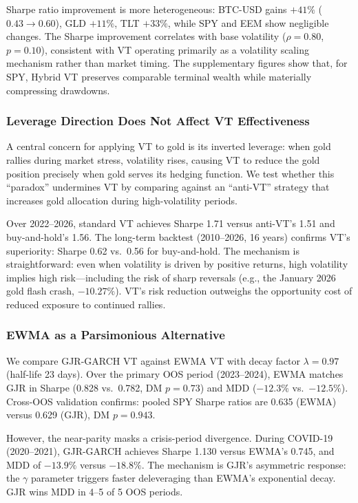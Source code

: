 Sharpe ratio improvement is more heterogeneous: BTC-USD gains $+41\%$ ($0.43 \to 0.60$), GLD $+11\%$, TLT $+33\%$, while SPY and EEM show negligible changes. The Sharpe improvement correlates with base volatility ($\rho = 0.80$, $p = 0.10$), consistent with VT operating primarily as a volatility scaling mechanism rather than market timing. The supplementary figures show that, for SPY, Hybrid VT preserves comparable terminal wealth while materially compressing drawdowns.

\subsubsection{Leverage Direction Does Not Affect VT Effectiveness}

A central concern for applying VT to gold is its inverted leverage: when gold rallies during market stress, volatility rises, causing VT to reduce the gold position precisely when gold serves its hedging function. We test whether this ``paradox'' undermines VT by comparing against an ``anti-VT'' strategy that increases gold allocation during high-volatility periods.

Over 2022--2026, standard VT achieves Sharpe 1.71 versus anti-VT's 1.51 and buy-and-hold's 1.56. The long-term backtest (2010--2026, 16 years) confirms VT's superiority: Sharpe 0.62 vs.\ 0.56 for buy-and-hold. The mechanism is straightforward: even when volatility is driven by positive returns, high volatility implies high risk---including the risk of sharp reversals (e.g., the January 2026 gold flash crash, $-10.27\%$). VT's risk reduction outweighs the opportunity cost of reduced exposure to continued rallies.

\subsubsection{EWMA as a Parsimonious Alternative}
\label{sec:ewma_vt}

We compare GJR-GARCH VT against EWMA VT with decay factor $\lambda = 0.97$ (half-life 23 days). Over the primary OOS period (2023--2024), EWMA matches GJR in Sharpe (0.828 vs.\ 0.782, DM $p = 0.73$) and MDD ($-12.3\%$ vs.\ $-12.5\%$). Cross-OOS validation confirms: pooled SPY Sharpe ratios are 0.635 (EWMA) versus 0.629 (GJR), DM $p = 0.943$.

However, the near-parity masks a crisis-period divergence. During COVID-19 (2020--2021), GJR-GARCH achieves Sharpe 1.130 versus EWMA's 0.745, and MDD of $-13.9\%$ versus $-18.8\%$. The mechanism is GJR's asymmetric response: the $\gamma$ parameter triggers faster deleveraging than EWMA's exponential decay. GJR wins MDD in 4--5 of 5 OOS periods.

